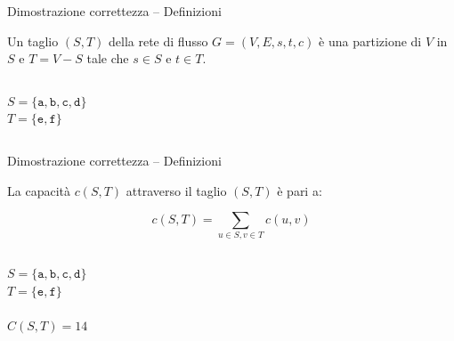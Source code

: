 \begin{frame}{Dimostrazione correttezza -- Definizioni}

\vspace{-12pt}
\begin{myboxtitle}[Taglio]
Un \alert{taglio} $(S,T)$ della rete di flusso 
$G=(V,E,s,t,c)$ è una partizione di $V$ in $S$ e $T=V-S$
tale che $s \in S$ e $t \in T$.
\end{myboxtitle}

\vspace{-12pt}
\begin{columns}[T]
\vspace{18pt}
$S = \{ \mathtt{a}, \mathtt{b}, \mathtt{c}, \mathtt{d} \}$\\
$T = \{ \mathtt{e}, \mathtt{f} \}$\\
\end{columns}


\end{frame}


\begin{frame}{Dimostrazione correttezza -- Definizioni}

\vspace{-12pt}
\begin{myboxtitle}
La \alert{capacità} $c(S,T)$ attraverso il taglio $(S,T)$ è pari a:

\[
  c(S,T) = \sum_{u \in S, v \in T} c(u,v)
\]
\end{myboxtitle}

\vspace{-12pt}
\begin{columns}[T]
\vspace{18pt}
$S = \{ \mathtt{a}, \mathtt{b}, \mathtt{c}, \mathtt{d} \}$\\
$T = \{ \mathtt{e}, \mathtt{f} \}$\\
~\\
$C(S,T) = 14$
\end{columns}

\end{frame}

